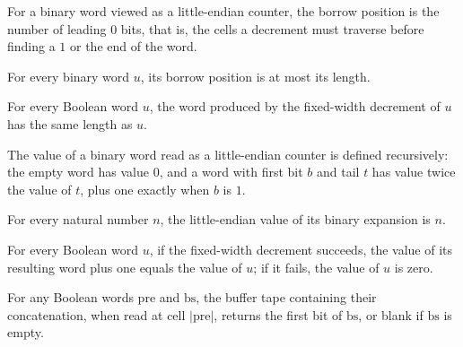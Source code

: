 \begin{definition}
\label{Complexity.a2BorrowPos}
\leanok
For a binary word viewed as a little-endian counter, the borrow position is the number of leading $0$ bits, that is, the cells a decrement must traverse before finding a $1$ or the end of the word.
\end{definition}

\begin{lemma}
\label{Complexity.a2BorrowPos_le}
\leanok
{}
For every binary word $u$, its borrow position is at most its length.
\end{lemma}

\begin{lemma}
\label{Complexity.a2Debit_length}
\leanok
{}
For every Boolean word $u$, the word produced by the fixed-width decrement of $u$ has
the same length as $u$.
\end{lemma}

\begin{definition}
\label{Complexity.a2Value}
\leanok
The value of a binary word read as a little-endian counter is defined recursively: the empty word has value $0$, and a word with first bit $b$ and tail $t$ has value twice the value of $t$, plus one exactly when $b$ is $1$.
\end{definition}

\begin{lemma}
\label{Complexity.a2Value_bits}
\leanok
{}
For every natural number $n$, the little-endian value of its binary expansion is $n$.
\end{lemma}

\begin{lemma}
\label{Complexity.a2Debit_value}
\leanok
{}
For every Boolean word $u$, if the fixed-width decrement succeeds, the value of its
resulting word plus one equals the value of $u$; if it fails, the value of $u$ is zero.
\end{lemma}

\begin{lemma}
\label{Complexity.a2Buffer_read}
\leanok
{}
For any Boolean words $\mathrm{pre}$ and $\mathrm{bs}$, the buffer tape containing their
concatenation, when read at cell $|\mathrm{pre}|$, returns the first bit of
$\mathrm{bs}$, or blank if $\mathrm{bs}$ is empty.
\end{lemma}

